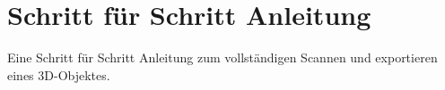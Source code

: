 \section{Schritt für Schritt Anleitung}
\label{sec:StepbyStep}

Eine Schritt für Schritt Anleitung zum vollständigen Scannen und exportieren eines 3D-Objektes.

